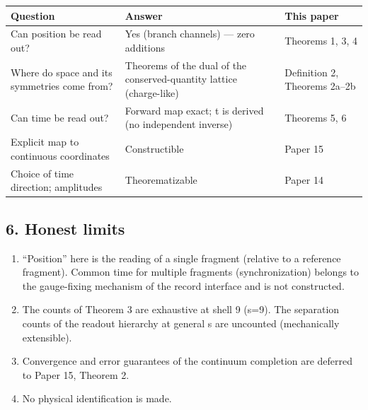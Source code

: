 \documentclass[
]{ltjsarticle}
\newcounter{none} %
\providecommand{\tightlist}{%
  \setlength{\itemsep}{0pt}\setlength{\parskip}{0pt}}
\begin{document}
{\def\LTcaptype{none} %
\begin{longtable}[]{@{}
  >{\raggedright\arraybackslash}p{}
  >{\raggedright\arraybackslash}p{}
  >{\raggedright\arraybackslash}p{}@{}}
\toprule\noalign{}
\begin{minipage}[b]{\linewidth}\raggedright
Question
\end{minipage} & \begin{minipage}[b]{\linewidth}\raggedright
Answer
\end{minipage} & \begin{minipage}[b]{\linewidth}\raggedright
This paper
\end{minipage} \\
\midrule\noalign{}
\endhead
\bottomrule\noalign{}
\endlastfoot
Can position be read out? & Yes (branch channels) --- zero additions &
Theorems 1, 3, 4 \\
Where do space and its symmetries come from? & Theorems of the dual of
the conserved-quantity lattice (charge-like) & Definition 2, Theorems
2a--2b \\
Can time be read out? & Forward map exact; t is derived (no independent
inverse) & Theorems 5, 6 \\
Explicit map to continuous coordinates & Constructible & Paper 15 \\
Choice of time direction; amplitudes & Theorematizable & Paper 14 \\
\end{longtable}
}

\subsection{6. Honest limits}\label{honest-limits}

\begin{enumerate}
\def\labelenumi{\arabic{enumi}.}
\tightlist
\item
  ``Position'' here is the reading of a single fragment (relative to a
  reference fragment). Common time for multiple fragments
  (synchronization) belongs to the gauge-fixing mechanism of the record
  interface and is not constructed.
\item
  The counts of Theorem 3 are exhaustive at shell 9 (s=9). The
  separation counts of the readout hierarchy at general s are uncounted
  (mechanically extensible).
\item
  Convergence and error guarantees of the continuum completion are
  deferred to Paper 15, Theorem 2.
\item
  No physical identification is made.
\end{enumerate}
\end{document}

